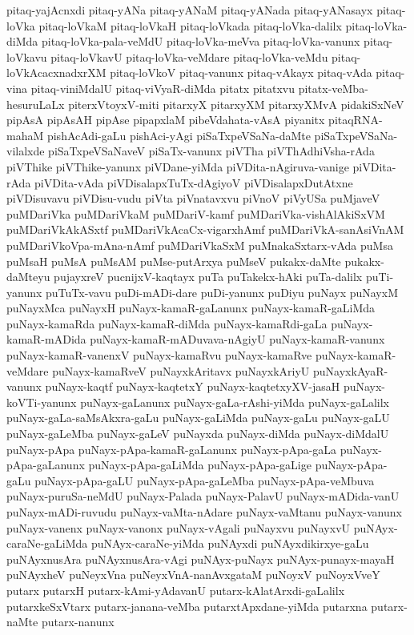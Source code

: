 {pitaq-yajAcnxdi
pitaq-yANa
pitaq-yANaM
pitaq-yANada
pitaq-yANasayx
pitaq-loVka
pitaq-loVkaM
pitaq-loVkaH
pitaq-loVkada
pitaq-loVka-dalilx
pitaq-loVka-diMda
pitaq-loVka-pala-veMdU
pitaq-loVka-meVva
pitaq-loVka-vanunx
pitaq-loVkavu
pitaq-loVkavU
pitaq-loVka-veMdare
pitaq-loVka-veMdu
pitaq-loVkAcacxnadxrXM
pitaq-loVkoV
pitaq-vanunx
pitaq-vAkayx
pitaq-vAda
pitaq-vina
pitaq-viniMdalU
pitaq-viVyaR-diMda
pitatx
pitatxvu
pitatx-veMba-hesuruLaLx
piterxVtoyxV-miti
pitarxyX
pitarxyXM
pitarxyXMvA
pidakiSxNeV
pipAsA
pipAsAH
pipAse
pipapxlaM
pibeVdahata-vAsA
piyanitx
pitaqRNA-mahaM
pishAcAdi-gaLu
pishAci-yAgi
piSaTxpeVSaNa-daMte
piSaTxpeVSaNa-vilalxde
piSaTxpeVSaNaveV
piSaTx-vanunx
piVTha
piVThAdhiVsha-rAda
piVThike
piVThike-yanunx
piVDane-yiMda
piVDita-nAgiruva-vanige
piVDita-rAda
piVDita-vAda
piVDisalapxTuTx-dAgiyoV
piVDisalapxDutAtxne
piVDisuvavu
piVDisu-vudu
piVta
piVnatavxvu
piVnoV
piVyUSa
puMjaveV
puMDariVka
puMDariVkaM
puMDariV-kamf
puMDariVka-vishAlAkiSxVM
puMDariVkAkASxtf
puMDariVkAcaCx-vigarxhAmf
puMDariVkA-sanAsiVnAM
puMDariVkoVpa-mAna-nAmf
puMDariVkaSxM
puMnakaSxtarx-vAda
puMsa
puMsaH
puMsA
puMsAM
puMse-putArxya
puMseV
pukakx-daMte
pukakx-daMteyu
pujayxreV
pucnijxV-kaqtayx
puTa
puTakekx-hAki
puTa-dalilx
puTi-yanunx
puTuTx-vavu
puDi-mADi-dare
puDi-yanunx
puDiyu
puNayx
puNayxM
puNayxMca
puNayxH
puNayx-kamaR-gaLanunx
puNayx-kamaR-gaLiMda
puNayx-kamaRda
puNayx-kamaR-diMda
puNayx-kamaRdi-gaLa
puNayx-kamaR-mADida
puNayx-kamaR-mADuvava-nAgiyU
puNayx-kamaR-vanunx
puNayx-kamaR-vanenxV
puNayx-kamaRvu
puNayx-kamaRve
puNayx-kamaR-veMdare
puNayx-kamaRveV
puNayxkAritavx
puNayxkAriyU
puNayxkAyaR-vanunx
puNayx-kaqtf
puNayx-kaqtetxY
puNayx-kaqtetxyXV-jasaH
puNayx-koVTi-yanunx
puNayx-gaLanunx
puNayx-gaLa-rAshi-yiMda
puNayx-gaLalilx
puNayx-gaLa-saMsAkxra-gaLu
puNayx-gaLiMda
puNayx-gaLu
puNayx-gaLU
puNayx-gaLeMba
puNayx-gaLeV
puNayxda
puNayx-diMda
puNayx-diMdalU
puNayx-pApa
puNayx-pApa-kamaR-gaLanunx
puNayx-pApa-gaLa
puNayx-pApa-gaLanunx
puNayx-pApa-gaLiMda
puNayx-pApa-gaLige
puNayx-pApa-gaLu
puNayx-pApa-gaLU
puNayx-pApa-gaLeMba
puNayx-pApa-veMbuva
puNayx-puruSa-neMdU
puNayx-Palada
puNayx-PalavU
puNayx-mADida-vanU
puNayx-mADi-ruvudu
puNayx-vaMta-nAdare
puNayx-vaMtanu
puNayx-vanunx
puNayx-vanenx
puNayx-vanonx
puNayx-vAgali
puNayxvu
puNayxvU
puNAyx-caraNe-gaLiMda
puNAyx-caraNe-yiMda
puNAyxdi
puNAyxdikirxye-gaLu
puNAyxnusAra
puNAyxnusAra-vAgi
puNAyx-puNayx
puNAyx-punayx-mayaH
puNAyxheV
puNeyxVna
puNeyxVnA-nanAvxgataM
puNoyxV
puNoyxVveY
putarx
putarxH
putarx-kAmi-yAdavanU
putarx-kAlatArxdi-gaLalilx
putarxkeSxVtarx
putarx-janana-veMba
putarxtApxdane-yiMda
putarxna
putarx-naMte
putarx-nanunx
}

